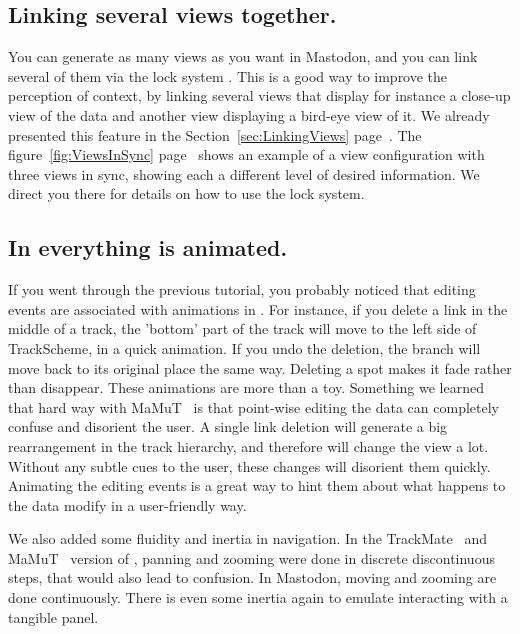 \subsection{Linking several views together.}

You can generate as many views as you want in Mastodon, and you can link several of them via the lock system .
This is a good way to improve the perception of context, by linking several views that display for instance a close-up view of the data and another view displaying a bird-eye view of it.
We already presented this feature in the Section~\ref{sec:LinkingViews} page~\pageref{sec:LinkingViews}. 
The figure~\ref{fig:ViewsInSync} page~\pageref{fig:ViewsInSync} shows an example of a view configuration with three views in sync, showing each a different level of desired information.
We direct you there for details on how to use the lock system.


\subsection{In \TrackScheme everything is animated.}

If you went through the previous tutorial, you probably noticed that editing events are associated with animations in \TrackScheme.
For instance, if you delete a link in the middle of a track, the 'bottom' part of the track will move to the left side of TrackScheme, in a quick animation.
If you undo the deletion, the branch will move back to its original place the same way. 
Deleting a spot makes it fade rather than disappear.
These animations are more than a toy.
Something we learned that hard way with MaMuT~\cite{MaMuT} is that point-wise editing the data can completely confuse and disorient the user.
A single link deletion will generate a big rearrangement in the track hierarchy, and therefore will change the \TrackScheme view a lot. 
Without any subtle cues to the user, these changes will disorient them quickly.
Animating the editing events is a great way to hint them about what happens to the data modify in a user-friendly way.

We also added some fluidity and inertia in \TrackScheme navigation. 
In the TrackMate~\cite{TrackMate} and MaMuT~\cite{MaMuT} version of \TrackScheme, panning and zooming were done in discrete discontinuous steps, that would also lead to confusion.
In Mastodon, moving and zooming are done continuously. 
There is even some inertia again to emulate interacting with a tangible panel.



